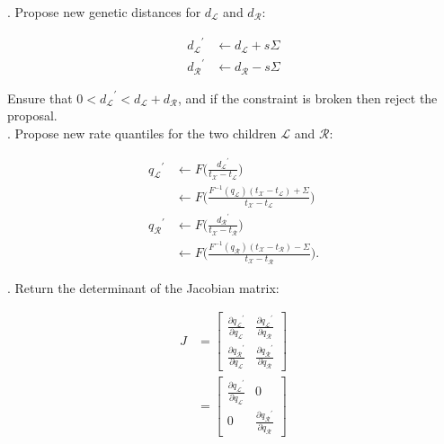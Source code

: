 \documentclass[12pt]{article}
\begin{document}
. Propose new genetic distances for $d_\mathcal{L}$ and $d_\mathcal{R}$:

\begin{align}
	{d_\mathcal{L}}^\prime & \leftarrow d_\mathcal{L} + s\Sigma \\
	{d_\mathcal{R}}^\prime & \leftarrow d_\mathcal{R} - s\Sigma
\end{align}


Ensure that $0 < {d_\mathcal{L}}^\prime < d_\mathcal{L} + d_\mathcal{R}$, and if the constraint is broken then reject the proposal.  \\




. Propose new rate quantiles for the two children $\mathcal{L}$ and $\mathcal{R}$:


\begin{align}
	{q_\mathcal{L}}^\prime &\leftarrow F\big( \frac{{d_\mathcal{L}}^\prime}{t_\mathcal{X} - t_\mathcal{L}} \big) \nonumber\\
				 &\leftarrow F\big( \frac{F^{-1} (q_\mathcal{L}) (t_\mathcal{X} - t_\mathcal{L}) + \Sigma}{t_\mathcal{X} - t_\mathcal{L}} \big) \\
	{q_\mathcal{R}}^\prime &\leftarrow F\big( \frac{{d_\mathcal{R}}^\prime}{t_\mathcal{X} - t_\mathcal{R}} \big) \nonumber \\
				 &\leftarrow F\big( \frac{F^{-1} (q_\mathcal{R}) (t_\mathcal{X} - t_\mathcal{R}) - \Sigma}{t_\mathcal{X} - t_\mathcal{R}} \big).
\end{align}



. Return the determinant of the Jacobian matrix:


\begin{align}
	J &= \begin{bmatrix} \frac{\partial {q_\mathcal{L}}^\prime}{\partial q_\mathcal{L}} & \frac{\partial {q_\mathcal{L}}^\prime}{\partial q_\mathcal{R}} \\
						 \frac{\partial {q_\mathcal{R}}^\prime}{\partial q_\mathcal{L}} & \frac{\partial {q_\mathcal{R}}^\prime}{\partial q_\mathcal{R}} \end{bmatrix} \nonumber \\
	 &= \begin{bmatrix} \frac{\partial {q_\mathcal{L}}^\prime}{\partial q_\mathcal{L}} & 0 \\
						 0 & \frac{\partial {q_\mathcal{R}}^\prime}{\partial q_\mathcal{R}} \end{bmatrix}
\end{align}
\end{document}
